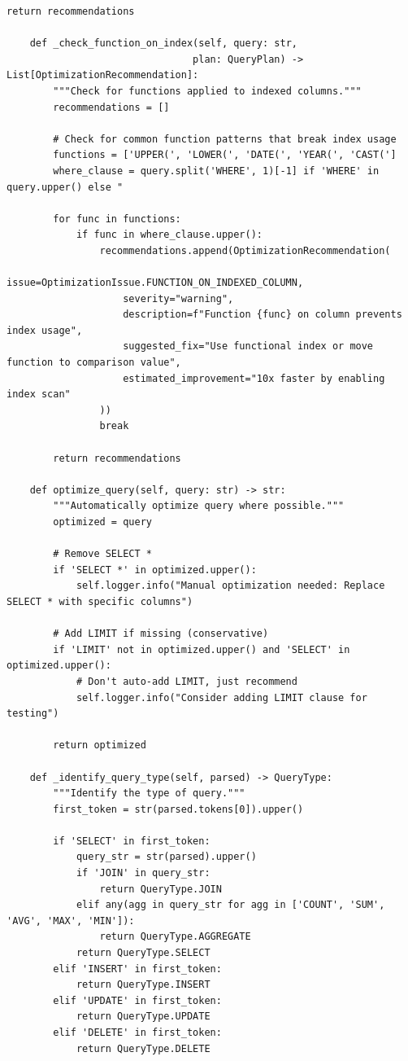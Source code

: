 \begin{lstlisting}[style=python, caption=QueryOptimizer with Cost-Based Analysis]
        return recommendations

    def _check_function_on_index(self, query: str,
                                plan: QueryPlan) -> List[OptimizationRecommendation]:
        """Check for functions applied to indexed columns."""
        recommendations = []

        # Check for common function patterns that break index usage
        functions = ['UPPER(', 'LOWER(', 'DATE(', 'YEAR(', 'CAST(']
        where_clause = query.split('WHERE', 1)[-1] if 'WHERE' in query.upper() else "

        for func in functions:
            if func in where_clause.upper():
                recommendations.append(OptimizationRecommendation(
                    issue=OptimizationIssue.FUNCTION_ON_INDEXED_COLUMN,
                    severity="warning",
                    description=f"Function {func} on column prevents index usage",
                    suggested_fix="Use functional index or move function to comparison value",
                    estimated_improvement="10x faster by enabling index scan"
                ))
                break

        return recommendations

    def optimize_query(self, query: str) -> str:
        """Automatically optimize query where possible."""
        optimized = query

        # Remove SELECT *
        if 'SELECT *' in optimized.upper():
            self.logger.info("Manual optimization needed: Replace SELECT * with specific columns")

        # Add LIMIT if missing (conservative)
        if 'LIMIT' not in optimized.upper() and 'SELECT' in optimized.upper():
            # Don't auto-add LIMIT, just recommend
            self.logger.info("Consider adding LIMIT clause for testing")

        return optimized

    def _identify_query_type(self, parsed) -> QueryType:
        """Identify the type of query."""
        first_token = str(parsed.tokens[0]).upper()

        if 'SELECT' in first_token:
            query_str = str(parsed).upper()
            if 'JOIN' in query_str:
                return QueryType.JOIN
            elif any(agg in query_str for agg in ['COUNT', 'SUM', 'AVG', 'MAX', 'MIN']):
                return QueryType.AGGREGATE
            return QueryType.SELECT
        elif 'INSERT' in first_token:
            return QueryType.INSERT
        elif 'UPDATE' in first_token:
            return QueryType.UPDATE
        elif 'DELETE' in first_token:
            return QueryType.DELETE


\end{lstlisting}
